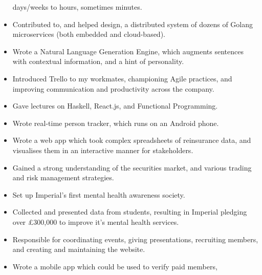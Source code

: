 \documentclass{jcgcv}
\begin{document}
\begin{column}
\begin{itemize}
          days/weeks to hours, sometimes minutes.
    \item Contributed to, and helped design, a distributed system of dozens
          of Golang microservices (both embedded and cloud-based).
    \item Wrote a Natural Language Generation Engine, which augments
          sentences with contextual information, and a hint of personality.
    \item Introduced Trello to my workmates, championing Agile practices,
          and improving communication and productivity across the company.
    \item Gave lectures on Haskell, React.js, and Functional Programming.
  \end{itemize}
  \vgap
  \begin{itemize}\setlength\itemsep{0.25em}
    \item Wrote real-time person tracker, which runs on an Android phone.
  \end{itemize}
  \vgap
  \begin{itemize}\setlength\itemsep{0.25em}
    \item Wrote a web app which took complex spreadsheets of reinsurance
          data, and visualises them in an interactive manner for stakeholders.
    \item Gained a strong understanding of the securities market, and various
          trading and risk management strategies.
  \end{itemize}
  \vgap
  \begin{itemize}\setlength\itemsep{0.25em}
    \item Set up Imperial's first mental health awareness society.
    \item Collected and presented data from students, resulting in Imperial
          pledging over \pounds300,000 to improve it's mental health services.
    \item Responsible for coordinating events, giving presentations, recruiting
          members, and creating and maintaining the website.
  \end{itemize}
  \vgap
  \begin{itemize}\setlength\itemsep{0.25em}
    \item Wrote a mobile app which could be used to verify paid members,

\end{itemize}
\end{column}
\end{document}

